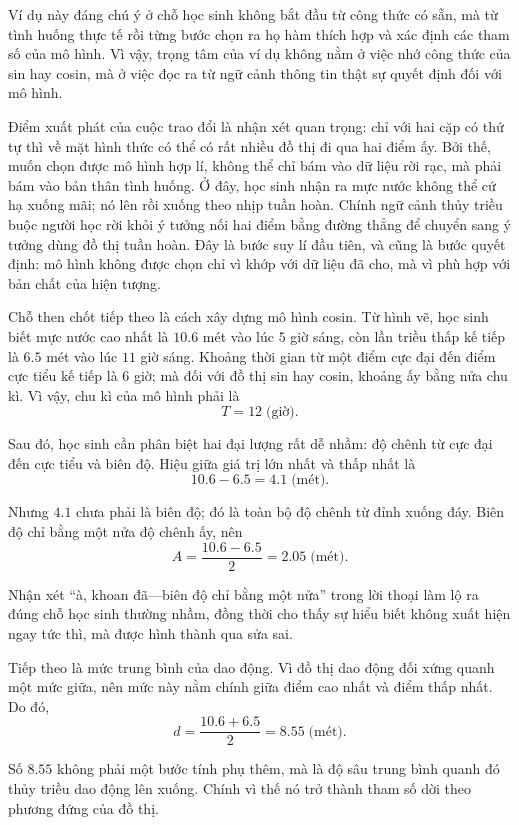   {
    Ví dụ này đáng chú ý ở chỗ học sinh không bắt đầu từ công thức có sẵn, mà từ tình huống thực tế rồi từng bước chọn ra họ hàm thích hợp và xác định các tham số của mô hình. Vì vậy, trọng tâm của ví dụ không nằm ở việc nhớ công thức của sin hay cosin, mà ở việc đọc ra từ ngữ cảnh thông tin thật sự quyết định đối với mô hình.

    Điểm xuất phát của cuộc trao đổi là nhận xét quan trọng: chỉ với hai cặp có thứ tự thì về mặt hình thức có thể có rất nhiều đồ thị đi qua hai điểm ấy. Bởi thế, muốn chọn được mô hình hợp lí, không thể chỉ bám vào dữ liệu rời rạc, mà phải bám vào bản thân tình huống. Ở đây, học sinh nhận ra mực nước không thể cứ hạ xuống mãi; nó lên rồi xuống theo nhịp tuần hoàn. Chính ngữ cảnh thủy triều buộc người học rời khỏi ý tưởng nối hai điểm bằng đường thẳng để chuyển sang ý tưởng dùng đồ thị tuần hoàn. Đây là bước suy lí đầu tiên, và cũng là bước quyết định: mô hình không được chọn chỉ vì khớp với dữ liệu đã cho, mà vì phù hợp với bản chất của hiện tượng.

    Chỗ then chốt tiếp theo là cách xây dựng mô hình cosin. Từ hình vẽ, học sinh biết mực nước cao nhất là $10.6$ mét vào lúc $5$ giờ sáng, còn lần triều thấp kế tiếp là $6.5$ mét vào lúc $11$ giờ sáng. Khoảng thời gian từ một điểm cực đại đến điểm cực tiểu kế tiếp là $6$ giờ; mà đối với đồ thị sin hay cosin, khoảng ấy bằng nửa chu kì. Vì vậy, chu kì của mô hình phải là
    $$
    T=12\; \text{(giờ)}.
    $$

    Sau đó, học sinh cần phân biệt hai đại lượng rất dễ nhầm: độ chênh từ cực đại đến cực tiểu và biên độ. Hiệu giữa giá trị lớn nhất và thấp nhất là
    $$
    10.6-6.5=4.1\; \text{(mét)}.
    $$

    Nhưng $4.1$ chưa phải là biên độ; đó là toàn bộ độ chênh từ đỉnh xuống đáy. Biên độ chỉ bằng một nửa độ chênh ấy, nên
    $$
    A=\frac{10.6-6.5}{2}=2.05\; \text{(mét)}.
    $$

    Nhận xét ``à, khoan đã---biên độ chỉ bằng một nửa'' trong lời thoại làm lộ ra đúng chỗ học sinh thường nhầm, đồng thời cho thấy sự hiểu biết không xuất hiện ngay tức thì, mà được hình thành qua sửa sai.

    Tiếp theo là mức trung bình của dao động. Vì đồ thị dao động đối xứng quanh một mức giữa, nên mức này nằm chính giữa điểm cao nhất và điểm thấp nhất. Do đó,
    $$
    d=\frac{10.6+6.5}{2}=8.55\; \text{(mét)}.
    $$

    Số $8.55$ không phải một bước tính phụ thêm, mà là độ sâu trung bình quanh đó thủy triều dao động lên xuống. Chính vì thế nó trở thành tham số dời theo phương đứng của đồ thị.

}
